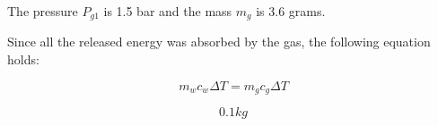 The pressure \( P_{g1} \) is 1.5 bar and the mass \( m_g \) is 3.6 grams.

Since all the released energy was absorbed by the gas, the following equation holds:

\[ m_w c_w \Delta T = m_g c_g \Delta T \]

\[ 0.1 kg \]